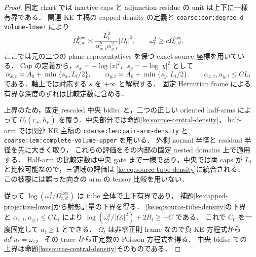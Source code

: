 \begin{proof}
固定 chart では inactive caps と adjunction residue の unit は上下に一様有界である．
関連 KE 主稿の capped density の定義と
\texttt{coarse:cor:degree-d-volume-lower} により
\[
 \Omega_{t,d}^{\mathrm{low}}\asymp
 \frac{L_t^2}{\alpha_{x,t}^2\alpha_{y,t}^2}|\Omega_t|^2,
 \qquad \omega_t^2\ge c\Omega_{t,d}^{\mathrm{low}}.
\]
ここでは元の二つの plane representatives を保つ exact source 座標を用いている．
Cap の定義から，$s_x=-\log|x|^2$，$s_y=-\log|y|^2$ として
\begin{equation}\label{ke:eq:source-cap-depth}
 \alpha_{x,t}\asymp A_0+\min\{s_x,L_t/2\},\qquad
 \alpha_{y,t}\asymp A_0+\min\{s_y,L_t/2\},
 \qquad \alpha_{x,t},\alpha_{y,t}\le C L_t
\end{equation}
である．軸上では対応する $s$ を $+\infty$ と解釈する．
固定 Hermitian frame による有界な深度のずれは比較定数に含める．

上界のため，固定 rescaled 中央 bidisc と，二つの正しい oriented half-arms
によって $U_t(r_+,b_+)$ を覆う．中央部分では命題\ref{ke:source-central-density}，
half-arm では関連 KE 主稿の
\texttt{coarse:lem:pair-arm-density} と
\texttt{coarse:lem:complete-volume-upper} を用いる．
外側 normal 半径と residual 半径を先に大きく取り，
これらの評価をその内部の固定 nested domains 上で適用する．
Half-arm の比較定数は中央 gate まで一様であり，中央では両 caps が
$L_t$ と比較可能なので，三領域の評価は
\eqref{ke:eq:source-tube-density}に統合される．
この被覆には誤った向きの arm の tensor 比較を用いない．

従って $\log(\omega_t^2/\Omega_{t,d}^{\mathrm{low}})$ は tube 全体で上下有界であり，
補題\ref{ke:capped-projective-lower}から射影計量の下界を得る．
\eqref{ke:eq:source-tube-density}の下界と
$\alpha_{x,t},\alpha_{y,t}\le CL_t$ により
$\log(\omega_t^2/|\Omega_t|^2)+2R_t\ge-C$ である．
これで $C_0$ を一度固定して $u_t\ge1$ とできる．
$\Omega_t$ は非零正則 frame なので負 KE 方程式から $dd^c u_t=\omega_t$，
その trace から正定数の Poisson 方程式を得る．
中央 bidisc での上界は命題\ref{ke:source-central-density}そのものである．
\end{proof}

